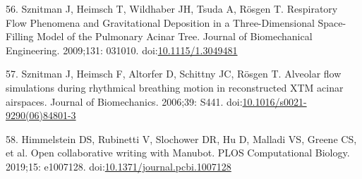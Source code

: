 \documentclass[
  american,
]{article}
\newenvironment{cslreferences}%
  {}%
  {\par}
\begin{document}
\begin{cslreferences}
\leavevmode\hypertarget{ref-afF83siN}{}%
56. Sznitman J, Heimsch T, Wildhaber JH, Tsuda A, Rösgen T. Respiratory Flow Phenomena and Gravitational Deposition in a Three-Dimensional Space-Filling Model of the Pulmonary Acinar Tree. Journal of Biomechanical Engineering. 2009;131: 031010. doi:\href{https://doi.org/10.1115/1.3049481}{10.1115/1.3049481}

\leavevmode\hypertarget{ref-k5fqLjiy}{}%
57. Sznitman J, Heimsch F, Altorfer D, Schittny JC, Rösgen T. Alveolar flow simulations during rhythmical breathing motion in reconstructed XTM acinar airspaces. Journal of Biomechanics. 2006;39: S441. doi:\href{https://doi.org/10.1016/s0021-9290(06)84801-3}{10.1016/s0021-9290(06)84801-3}

\leavevmode\hypertarget{ref-YuJbg3zO}{}%
58. Himmelstein DS, Rubinetti V, Slochower DR, Hu D, Malladi VS, Greene CS, et al. Open collaborative writing with Manubot. PLOS Computational Biology. 2019;15: e1007128. doi:\href{https://doi.org/10.1371/journal.pcbi.1007128}{10.1371/journal.pcbi.1007128}
\end{cslreferences}
\end{document}
